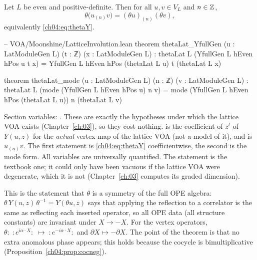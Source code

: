 \begin{theorem}\label{ch04:thm:thetamode}
Let $L$ be even and positive-definite. Then for all $u,v\in V_L$ and $n\in{\mathbb{Z}}$,
\begin{equation*}
  \theta\big(u_{(n)}v\big)=(\theta u)_{(n)}(\theta v),
\end{equation*}
equivalently \eqref{ch04:eq:thetaY}.
\end{theorem}

\begin{leancode}
-- VOA/Moonshine/LatticeInvolution.lean
theorem thetaLat_YfullGen (u : LatModuleGen L) (t : ℤ) (x : LatModuleGen L) :
    thetaLat L (YfullGen L hEven hPos u t x)
      = YfullGen L hEven hPos (thetaLat L u) t (thetaLat L x)

theorem thetaLat_mode (u : LatModuleGen L) (n : ℤ) (v : LatModuleGen L) :
    thetaLat L (mode (YfullGen L hEven hPos u) n v)
      = mode (YfullGen L hEven hPos (thetaLat L u)) n (thetaLat L v)
\end{leancode}

\begin{dictionary}
Section variables: . These are
exactly the hypotheses under which the lattice VOA exists (Chapter~\ref{ch:03}), so they cost
nothing.  is the coefficient of $z^t$ of $Y(u,z)$ for the
\emph{actual} vertex map of the lattice VOA  (not a model of it),
and  is $u_{(n)}v$. The first statement is \eqref{ch04:eq:thetaY}
coefficientwise, the second is the mode form. All variables are universally quantified. The
statement is the textbook one; it could only have been vacuous if the lattice VOA were degenerate,
which it is not (Chapter~\ref{ch:03} computes its graded dimension).
\end{dictionary}

\begin{physics}
This is the statement that $\theta$ is a symmetry of the full OPE algebra: $\theta\,Y(u,z)\,\theta^{-1}=Y(\theta u,z)$ says that applying the reflection to a correlator is the same as reflecting each inserted operator, so all OPE data (all structure constants) are invariant under $X\to-X$. For the vertex operators, $\theta:\;:\!e^{i\alpha\cdot X}\!:\;\mapsto\;:\!e^{-i\alpha\cdot X}\!:$ and $\partial X\mapsto-\partial X$. The point of the theorem is that no extra anomalous phase appears; this holds because the cocycle is bimultiplicative (Proposition~\ref{ch04:prop:cocneg}).
\end{physics}

